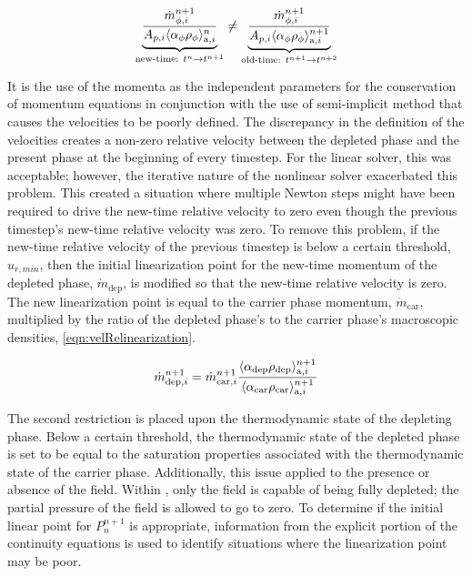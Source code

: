 \begin{equation}
\label{eqn:compareVelocities}
\underbrace{\frac{\dot{m}^{n+1}_{\phi, i}}{A_{p, i} \ave{\alpha_{\phi} \rho_{\phi}}^{n}_{\text{a}, i}}}_{\text{new-time: } t^{n} \rightarrow t^{n+1}} \neq \underbrace{\frac{\dot{m}^{n+1}_{\phi, i}}{A_{p, i} \ave{\alpha_{\phi} \rho_{\phi}}^{n+1}_{\text{a}, i}}}_{\text{old-time: } t^{n+1} \rightarrow t^{n+2}}
\end{equation}

It is the use of the momenta as the independent parameters for the conservation of momentum equations in conjunction with the use of semi-implicit method that causes the velocities to be poorly defined.
The discrepancy in the definition of the velocities creates a non-zero relative velocity between the depleted phase and the present phase at the beginning of every timestep.
For the linear solver, this was acceptable; however, the iterative nature of the nonlinear solver exacerbated this problem.
This created a situation where multiple Newton steps might have been required to drive the new-time relative velocity to zero even though the previous timestep's new-time relative velocity was zero.
To remove this problem, if the new-time relative velocity of the previous timestep is below a certain threshold, $u_{r, min}$, then the initial linearization point for the new-time momentum of the depleted phase, $\dot{m}_{\text{dep}}$, is modified so that the new-time relative velocity is zero.
The new linearization point is equal to the carrier phase momentum, $\dot{m}_{\text{car}}$, multiplied by the ratio of the depleted phase's to the carrier phase's macroscopic densities, \eqref{eqn:velRelinearization}.

\begin{equation}
\label{eqn:velRelinearization}
\dot{m}^{n+1}_{\text{dep}, i} = \dot{m}^{n+1}_{\text{car}, i} \frac{\ave{\alpha_{\text{dep}} \rho_{\text{dep}}}^{n+1}_{\text{a}, i}}{\ave{\alpha_{\text{car}} \rho_{\text{car}}}^{n+1}_{\text{a}, i}}
\end{equation}

The second restriction is placed upon the thermodynamic state of the depleting phase.
Below a certain threshold, the thermodynamic state of the depleted phase is set to be equal to the saturation properties associated with the thermodynamic state of the carrier phase.
Additionally, this issue applied to the presence or absence of the \ncg{} field.
Within \cobra{}, only the \ncg{} field is capable of being fully depleted; the partial pressure of the \ncg{} field is allowed to go to zero.
To determine if the initial linear point for $P^{n+1}_{n}$ is appropriate, information from the explicit portion of the continuity equations is used to identify situations where the linearization point may be poor.

